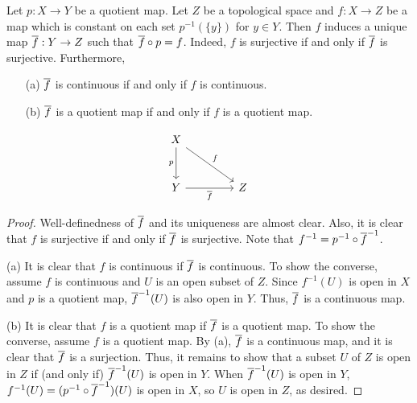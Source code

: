 \begin{thm}
    Let $p: X\rightarrow Y$ be a quotient map.
    Let $Z$ be a topological space and $f: X\rightarrow Z$ be a map which is constant on each set $p^{-1}(\{y\})$ for $y\in Y$.
    Then $f$ induces a unique map $\overline{f}: Y\rightarrow Z$ such that $\overline{f}\circ p=f$.
    Indeed, $f$ is surjective if and only if $\overline{f}$ is surjective.
    Furthermore,
    \begin{enumerate}
        \item[(a)]
        {
            $\overline{f}$ is continuous if and only if $f$ is continuous.
        }
        \item[(b)]
        {
            $\overline{f}$ is a quotient map if and only if $f$ is a quotient map.
        }
    \end{enumerate}
    \begin{equation*}
    \begin{tikzcd}[row sep=1.0cm, column sep=1.5cm]
        X
        \arrow[d, "p"']
        \arrow[dr, "f"]
        &\\
        Y\arrow[r, "\ol{f}"']
        &
        Z
    \end{tikzcd}
    \end{equation*}
\end{thm}
\begin{proof}
    Well-definedness of $\overline{f}$ and its uniqueness are almost clear.
    Also, it is clear that $f$ is surjective if and only if $\overline{f}$ is surjective.
    Note that $f^{-1}=p^{-1}\circ\overline{f}^{-1}$.

    \hangindent=0.65cm
    \noindent(a)
    It is clear that $f$ is continuous if $\overline{f}$ is continuous.
    To show the converse, assume $f$ is continuous and $U$ is an open subset of $Z$.
    Since $f^{-1}(U)$ is open in $X$ and $p$ is a quotient map, $\overline{f}^{-1}(U)$ is also open in $Y$.
    Thus, $\overline{f}$ is a continuous map.

    \noindent(b)
    It is clear that $f$ is a quotient map if $\overline{f}$ is a quotient map.
    To show the converse, assume $f$ is a quotient map.
    By (a), $\overline{f}$ is a continuous map, and it is clear that $\overline{f}$ is a surjection.
    Thus, it remains to show that a subset $U$ of $Z$ is open in $Z$ if (and only if) $\overline{f}^{-1}(U)$ is open in $Y$.
    When $\overline{f}^{-1}(U)$ is open in $Y$, $f^{-1}(U)=(p^{-1}\circ\overline{f}^{-1})(U)$ is open in $X$, so $U$ is open in $Z$, as desired.
\end{proof}

